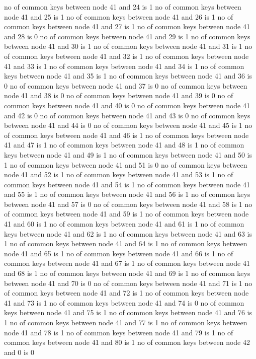 no of common keys between node 41 and 24 is 1
no of common keys between node 41 and 25 is 1
no of common keys between node 41 and 26 is 1
no of common keys between node 41 and 27 is 1
no of common keys between node 41 and 28 is 0
no of common keys between node 41 and 29 is 1
no of common keys between node 41 and 30 is 1
no of common keys between node 41 and 31 is 1
no of common keys between node 41 and 32 is 1
no of common keys between node 41 and 33 is 1
no of common keys between node 41 and 34 is 1
no of common keys between node 41 and 35 is 1
no of common keys between node 41 and 36 is 0
no of common keys between node 41 and 37 is 0
no of common keys between node 41 and 38 is 0
no of common keys between node 41 and 39 is 0
no of common keys between node 41 and 40 is 0
no of common keys between node 41 and 42 is 0
no of common keys between node 41 and 43 is 0
no of common keys between node 41 and 44 is 0
no of common keys between node 41 and 45 is 1
no of common keys between node 41 and 46 is 1
no of common keys between node 41 and 47 is 1
no of common keys between node 41 and 48 is 1
no of common keys between node 41 and 49 is 1
no of common keys between node 41 and 50 is 1
no of common keys between node 41 and 51 is 0
no of common keys between node 41 and 52 is 1
no of common keys between node 41 and 53 is 1
no of common keys between node 41 and 54 is 1
no of common keys between node 41 and 55 is 1
no of common keys between node 41 and 56 is 1
no of common keys between node 41 and 57 is 0
no of common keys between node 41 and 58 is 1
no of common keys between node 41 and 59 is 1
no of common keys between node 41 and 60 is 1
no of common keys between node 41 and 61 is 1
no of common keys between node 41 and 62 is 1
no of common keys between node 41 and 63 is 1
no of common keys between node 41 and 64 is 1
no of common keys between node 41 and 65 is 1
no of common keys between node 41 and 66 is 1
no of common keys between node 41 and 67 is 1
no of common keys between node 41 and 68 is 1
no of common keys between node 41 and 69 is 1
no of common keys between node 41 and 70 is 0
no of common keys between node 41 and 71 is 1
no of common keys between node 41 and 72 is 1
no of common keys between node 41 and 73 is 1
no of common keys between node 41 and 74 is 0
no of common keys between node 41 and 75 is 1
no of common keys between node 41 and 76 is 1
no of common keys between node 41 and 77 is 1
no of common keys between node 41 and 78 is 1
no of common keys between node 41 and 79 is 1
no of common keys between node 41 and 80 is 1
no of common keys between node 42 and 0 is 0
